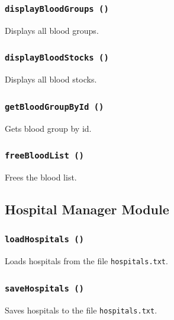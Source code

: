 \documentclass[12pt,a4paper]{report}
\begin{document}
\subsubsection{\texttt{displayBloodGroups ()}}
Displays all blood groups.


\subsubsection{\texttt{displayBloodStocks ()}}
Displays all blood stocks.


\subsubsection{\texttt{getBloodGroupById ()}}
Gets blood group by id.


\subsubsection{\texttt{freeBloodList ()}}
Frees the blood list.


\subsection{Hospital Manager Module}
\subsubsection{\texttt{loadHospitals ()}}
Loads hospitals from the file \texttt{hospitals.txt}.


\subsubsection{\texttt{saveHospitals ()}}
Saves hospitals to the file \texttt{hospitals.txt}.

\end{document}
